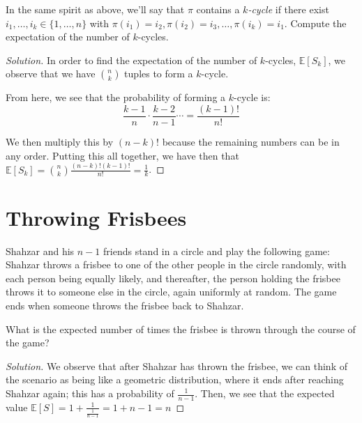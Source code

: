 \documentclass{article}
\newenvironment{solution}{\begin{proof}[Solution]}{\end{proof}}
\begin{document}
\begin{hw}
	In the same spirit as above, we'll say that $\pi$ contains a \emph{$k$-cycle} if there exist $i_1,\ldots,i_k \in \{1,\ldots,n\}$ with $\pi(i_1) = i_2,\pi(i_2) = i_3,\ldots,\pi(i_k) = i_1$. Compute the expectation of the number of $k$-cycles. 
\end{hw}
\begin{solution}
	In order to find the expectation of the number of $k$-cycles, $\mathbb{E}[S_{k}]$, we observe that we have $\binom{n}{k}$ tuples to form a $k$-cycle. 
	
	From here, we see that the probability of forming a $k$-cycle is:
	\begin{equation*}
		\dfrac{k-1}{n} \cdot \dfrac{k-2}{n-1} \cdots = \dfrac{(k-1)!}{n!}
	\end{equation*}

	We then multiply this by $(n-k)!$ because the remaining numbers can be in any order. Putting this all together, we have then that $\mathbb{E}[S_{k}] = \binom{n}{k} \frac{(n-k)!(k-1)!}{n!} = \frac{1}{k}$.
\end{solution}

\newpage

\section{Throwing Frisbees}
Shahzar and his $n-1$ friends stand in a circle and play the following game: Shahzar throws a frisbee to one of the other people in the circle randomly, with each person being equally likely, and thereafter, the person holding the frisbee throws it to someone else in the circle, again uniformly at random. The game ends when someone throws the frisbee back to Shahzar.
\begin{hw}
	What is the expected number of times the frisbee is thrown through the course of the game?
\end{hw}
\begin{solution}
	We observe that after Shahzar has thrown the frisbee, we can think of the scenario as being like a geometric distribution, where it ends after reaching Shahzar again; this has a probability of $\frac{1}{n-1}$. Then, we see that the expected value $\mathbb{E}[S] = 1 + \frac{1}{\frac{1}{n-1}} = 1 + n-1 = n$
\end{solution}
\end{document}
